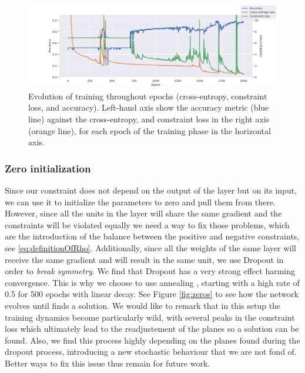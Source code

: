 \begin{figure}[h]
  \begin{center}
    \includegraphics[width=1.0\textwidth]{peaks}
      \caption{Evolution of training throughout epochs (cross-entropy, constraint loss, and accuracy). Left-hand axis show the accuracy metric (blue line) against the cross-entropy, and constraint loss in the right axis (orange line), for each epoch of the training phase in the horizontal axis.}
			\label{fig:peaks}
\end{center}
\end{figure}





\subsubsection{Zero initialization}\label{subsec:zero}

Since our constraint does not depend on the output of the layer but on its input, we can use it to initialize the parameters to zero and pull them from there. However, since all the units in the layer will share the same gradient and the constraints will be violated equally we need a way to fix those problems, which are the introduction of the balance between the positive and negative constraints, see \ref{eq:definitionOfRho}. Additionally, since all the weights of the same layer will receive the same gradient and will result in the same unit, we use Dropout \cite{dropout} in order to \emph{break symmetry}. We find that Dropout has a very strong effect harming convergence. This is why we choose to use annealing \cite{dropoutAnnealing}, starting with a high rate of 0.5 for 500 epochs with linear decay. See Figure \ref{fig:zeros} to see how the network evolves until finds a solution. We would like to remark that in this setup the training dynamics become particularly wild, with several peaks in the constraint loss which ultimately lead to the readjustement of the planes so a solution can be found. Also, we find this process highly depending on the planes found during the dropout process, introducing a new stochastic behaviour that we are not fond of. Better ways to fix this issue thus remain for future work.



